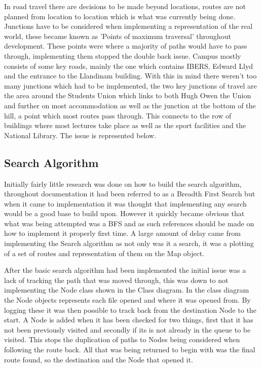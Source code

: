 In road travel there are decisions to be made beyond locations, routes are not planned from location to location which is what was currently being done. Junctions have to be considered when implementing a representation of the real world, these became known as 'Points of maximum traversal' throughout development. These points were where a majority of paths would have to pass through, implementing them stopped the double back issue. Campus mostly consists of some key roads, mainly the one which contains IBERS, Edward Llyd and the entrance to the Llandinam building. With this in mind there weren't too many junctions which had to be implemented, the two key junctions of travel are the area around the Students Union which links to both Hugh Owen the Union and further on most accommodation as well as the junction at the bottom of the hill, a point which most routes pass through. This connects to the row of buildings where most lectures take place as well as the sport facilities and the National Library. The issue is represented below.
\newpage
\subsection{Search Algorithm}

Initially fairly little research was done on how to build the search algorithm, throughout documentation it had been referred to as a Breadth First Search but when it came to implementation it was thought that implementing any search would be a good base to build upon. However it quickly became obvious that what was being attempted was a BFS and as such references should be made on how to implement it properly first time. A large amount of delay came from implementing the Search algorithm as not only was it a search, it was a plotting of a set of routes and representation of them on the Map object. 

After the basic search algorithm had been implemented the initial issue was a lack of tracking the path that was moved through, this was down to not implementing the Node class shown in the Class diagram. In the class diagram the Node objects represents each file opened and where it was opened from. By logging these it was then possible to track back from the destination Node to the start. A Node is added when it has been checked for two things, first that it has not been previously visited and secondly if its is not already in the queue to be visited. This stops the duplication of paths to Nodes being considered when following the route back. All that was being returned to begin with was the final route found, so the destination and the Node that opened it.

